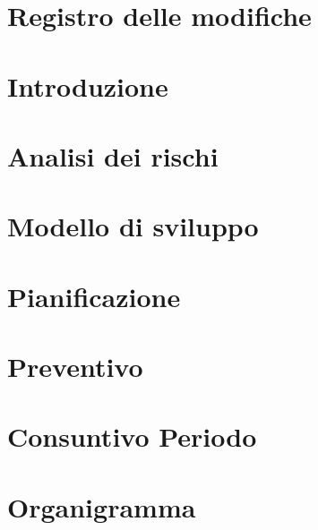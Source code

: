 \documentclass[a4paper, oneside, openany, dvipsnames, table]{article}
\begin{document}
    \copertina{}
    
    \section*{Registro delle modifiche}\label{sec:Registro-modifiche}
    
    
    \newpage
    \tableofcontents
    
    \newpage
    \listoftables
    
    \newpage
    \listoffigures
    
    \newpage
    \section{Introduzione}\label{sec:Introduzione}
    

    \newpage
    \section{Analisi dei rischi}\label{sec:Analisi-rischi}
    

    \newpage
    \section{Modello di sviluppo}\label{sec:Modello-sviluppo}
    

    \newpage
    \section{Pianificazione}\label{sec:Pianificazione}
    

    \newpage
    \section{Preventivo}\label{sec:Preventivo}
    

    \newpage
    \section{Consuntivo Periodo}\label{sec:Consuntivo-periodo}
    

    \newpage
    \section{Organigramma}\label{sec:Organigramma}
    
\end{document}
